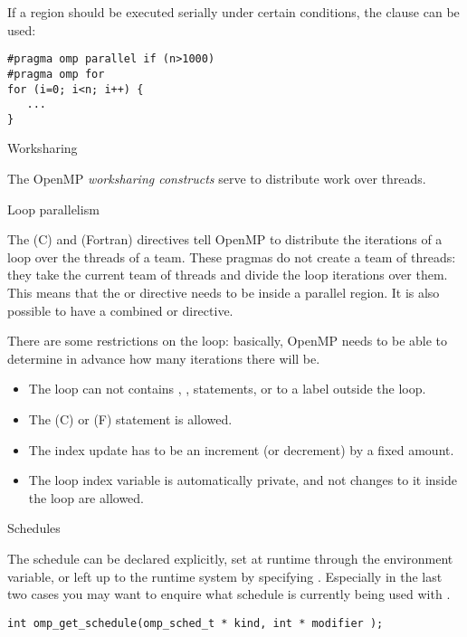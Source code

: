 If a region should be executed serially under certain conditions,
the  clause can be used:
\begin{verbatim}
#pragma omp parallel if (n>1000)
#pragma omp for
for (i=0; i<n; i++) {
   ...
}
\end{verbatim}

 {Worksharing}

The OpenMP \emph{worksharing constructs} serve to distribute work
over threads.

 {Loop parallelism}

The  (C) and  (Fortran) directives
tell OpenMP to distribute the iterations of a loop over the threads
of a team.
These pragmas do not create a team of threads: they
take the current team of threads and divide the loop iterations over them.
This means that the  or  directive needs to be
inside a parallel region. It is also possible to have a combined
 or  directive.

There are some restrictions on the loop: basically, OpenMP needs to be
able to determine in advance how many iterations there will be.
\begin{itemize}
\item The loop can not contains , ,  statements, or
   to a label outside the loop.
\item The  (C) or  (F) statement is allowed.
\item The index update has to be an increment (or decrement) by a fixed amount.
\item The loop index variable is automatically private, and not changes to it
  inside the loop are allowed.
\end{itemize}

 {Schedules}

The schedule can be declared explicitly, set at runtime
through the  environment variable, or left up to the runtime system
by specifying . Especially in the last two cases  you may want to enquire
what schedule is currently being used with
.
\begin{verbatim}
int omp_get_schedule(omp_sched_t * kind, int * modifier );
\end{verbatim}

